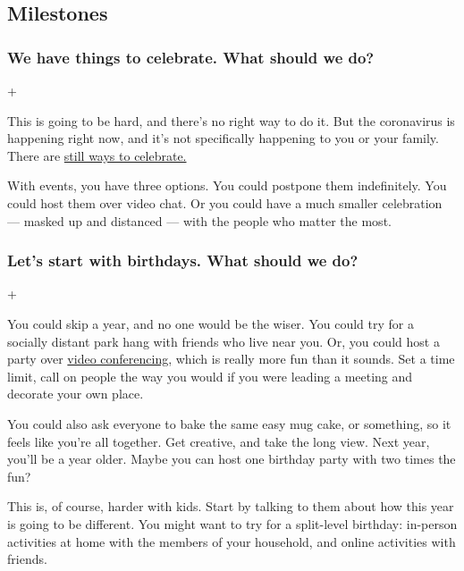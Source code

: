 \hypertarget{milestones}{%
\subsection{Milestones}\label{milestones}}

\hypertarget{we-have-things-to-celebrate-what-should-we-do}{%
\subsubsection{We have things to celebrate. What should we
do?}\label{we-have-things-to-celebrate-what-should-we-do}}

+

This is going to be hard, and there's no right way to do it. But the
coronavirus is happening right now, and it's not specifically happening
to you or your family. There are
\href{https://www.nytimes.com/2020/04/15/style/self-care/birthday-party-coronavirus-online-zoom.html}{still
ways to celebrate.}

With events, you have three options. You could postpone them
indefinitely. You could host them over video chat. Or you could have a
much smaller celebration --- masked up and distanced --- with the people
who matter the most.

\hypertarget{lets-start-with-birthdays-what-should-we-do}{%
\subsubsection{Let's start with birthdays. What should we
do?}\label{lets-start-with-birthdays-what-should-we-do}}

+

You could skip a year, and no one would be the wiser. You could try for
a socially distant park hang with friends who live near you. Or, you
could host a party over
\href{https://www.nytimes.com/2020/04/02/us/coronavirus-birthday-party.html}{video
conferencing,} which is really more fun than it sounds. Set a time
limit, call on people the way you would if you were leading a meeting
and decorate your own place.

You could also ask everyone to bake the same easy mug cake, or
something, so it feels like you're all together. Get creative, and take
the long view. Next year, you'll be a year older. Maybe you can host one
birthday party with two times the fun?

This is, of course, harder with kids. Start by talking to them about how
this year is going to be different. You might want to try for a
split-level birthday: in-person activities at home with the members of
your household, and online activities with friends.

